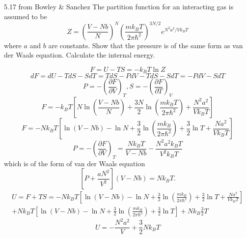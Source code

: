     \begin{eocproblem*}{5.17 from Bowley \& Sanchez}
        {
        The partition function for an interacting gas is assumed to be
        \[
        Z = \left( \frac{V - Nb}{N} \right)^N \left( \frac{mk_BT}{2\pi \hbar^2} \right)^{3N/2} e^{N^2 a^2 / V k_B T}
        \]
        where \(a\) and \(b\) are constants. Show that the pressure is of the same form as van der Waals equation. Calculate the internal energy.}
    \end{eocproblem*}
        \begin{equation}
        F = U - TS = -k_B T \ln Z
        \end{equation}
        \begin{equation}
        dF = dU - TdS - SdT = TdS - PdV - TdS - SdT = -PdV - SdT
        \end{equation}
        \begin{equation}
        P = - \left( \frac{\partial F}{\partial V} \right)_T , S = - \left( \frac{\partial F}{\partial T} \right)_V
        \end{equation}
        \begin{equation}
        F = -k_B T \left[ N \ln \left( \frac{V - Nb}{N} \right) + \frac{3N}{2} \ln \left( \frac{mk_B T}{2\pi \hbar^2} \right) + \frac{N^2 a^2}{V k_B T} \right]
        \end{equation}
        \begin{equation}
        F = -Nk_B T \left[ \ln (V - Nb) - \ln N + \frac{3}{2} \ln \left( \frac{mk_B }{2\pi \hbar^2} \right) + \frac{3}{2}\ln T + \frac{N a^2}{V k_B T} \right]
        \end{equation}
        \begin{equation}
        P = - \left( \frac{\partial F}{\partial V} \right)_T = \frac{Nk_B T}{V - Nb} - \frac{N^2 a^2 k_B T}{V^2 k_B T}
        \end{equation}
        which is of the form of van der Waals equation
        \begin{equation}
        \left[ P + \frac{aN^2}{V^2} \right] (V - Nb) = Nk_B T.
        \end{equation}
        \begin{equation*}
            \begin{split}
                U = F + TS =  -Nk_B T \left[ \ln (V - Nb) - \ln N + \frac{3}{2} \ln \left( \frac{mk_B }{2\pi \hbar^2} \right) + \frac{3}{2}\ln T + \frac{N a^2}{V k_B T} \right]
        \\
            +Nk_B T \left[ \ln (V - Nb) - \ln N + \frac{3}{2} \ln \left( \frac{mk_B }{2\pi \hbar^2} \right) + \frac{3}{2}\ln T\right] + N k_B \frac{3}{2}T
            \end{split}
        \end{equation*}
        \begin{equation}
            U = -\frac{N^2a^2}{V}+\frac{3}{2} Nk_B T
        \end{equation}

